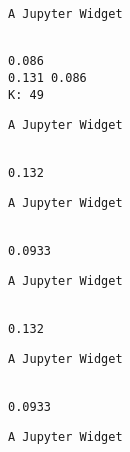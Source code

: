 \documentclass[11pt]{article}
\begin{document}
    
    \begin{verbatim}
A Jupyter Widget
    \end{verbatim}

    
    \begin{Verbatim}[commandchars=\\\{\}]

0.086
0.131 0.086
K: 49

    \end{Verbatim}

    
    \begin{verbatim}
A Jupyter Widget
    \end{verbatim}

    
    \begin{Verbatim}[commandchars=\\\{\}]

0.132

    \end{Verbatim}

    
    \begin{verbatim}
A Jupyter Widget
    \end{verbatim}

    
    \begin{Verbatim}[commandchars=\\\{\}]

0.0933

    \end{Verbatim}

    
    \begin{verbatim}
A Jupyter Widget
    \end{verbatim}

    
    \begin{Verbatim}[commandchars=\\\{\}]

0.132

    \end{Verbatim}

    
    \begin{verbatim}
A Jupyter Widget
    \end{verbatim}

    
    \begin{Verbatim}[commandchars=\\\{\}]

0.0933

    \end{Verbatim}

    
    \begin{verbatim}
A Jupyter Widget
    \end{verbatim}
\end{document}
